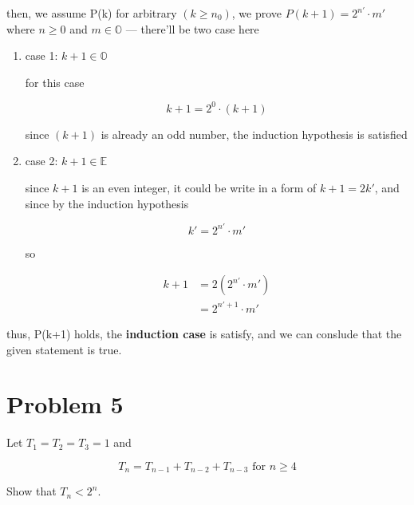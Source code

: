 then, we assume P(k) for arbitrary $(k \ge n_0)$, we prove $P(k+1) = 2^{n'}
\cdot m'$ where $n \ge 0$ and $m \in \mathbb{O}$ --- there'll be two case
here

\begin{enumerate}
\item case 1: $k + 1 \in \mathbb{O}$

for this case

\[
k + 1 = 2^0 \cdot (k + 1)
\]

since $(k + 1)$ is already an odd number, the induction hypothesis is
satisfied

\vspace{1em}

\item case 2: $k + 1 \in \mathbb{E}$

since $k + 1$ is an even integer, it could be write in a form of $k + 1 =
2k'$, and since by the induction hypothesis

\[
k' = 2^{n'} \cdot m'
\]

so

\[
\begin{aligned}
k + 1 &= 2(2^{n'} \cdot m') \\
&= 2^{n' + 1} \cdot m'
\end{aligned}
\]
\end{enumerate}

thus, P(k+1) holds, the \textbf{induction case} is satisfy, and we can
conslude that the given statement is true.

\vspace{1em}
\hrulefill

\section*{Problem 5}
Let $T_1 = T_2 = T_3 = 1$ and 

\[T_n = T_{n-1} + T_{n-2} + T_{n-3} \text{ for } n \ge 4\] 

Show that $T_n < 2^n$.

